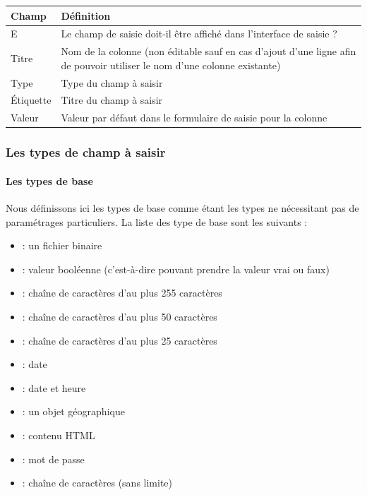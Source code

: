 \documentclass[letterpaper,10pt,french]{sphinxmanual}
\begin{document}
\begin{tabulary}{\linewidth}{|L|L|}
\hline

\textbf{Champ}
 & 
\textbf{Définition}
\\
\hline
E
 & 
Le champ de saisie doit-il être affiché dans l'interface de saisie ?
\\
\hline
Titre
 & 
Nom de la colonne (non éditable sauf en cas d'ajout d'une ligne afin de pouvoir utiliser le nom d'une colonne existante)
\\
\hline
Type
 & 
Type du champ à saisir
\\
\hline
Étiquette
 & 
Titre du champ à saisir
\\
\hline
Valeur
 & 
Valeur par défaut dans le formulaire de saisie pour la colonne
\\
\hline\end{tabulary}



\subsubsection{Les types de champ à saisir}
\label{tables/infopanel:les-types-de-champ-a-saisir}

\paragraph{Les types de base}
\label{tables/infopanel:les-types-de-base}
Nous définissons ici les types de base comme étant les types ne
nécessitant pas de paramétrages particuliers. La liste des type de
base sont les suivants :
\begin{itemize}
\item {} 
 : un fichier binaire

\item {} 
 : valeur booléenne (c'est-à-dire pouvant prendre la
valeur vrai ou faux)

\item {} 
 : chaîne de caractères d'au plus 255
caractères

\item {} 
 : chaîne de caractères d'au plus 50
caractères

\item {} 
 : chaîne de caractères d'au plus 25
caractères

\item {} 
 : date

\item {} 
 : date et heure

\item {} 
 : un objet géographique

\item {} 
 : contenu HTML

\item {} 
 : mot de passe

\item {} 
 : chaîne de caractères (sans limite)

\end{itemize}
\end{document}
